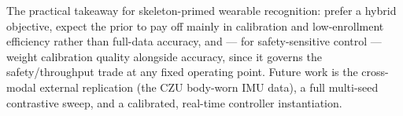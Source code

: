 The practical takeaway for skeleton-primed wearable recognition: prefer a hybrid objective, expect the prior to pay off mainly in calibration and low-enrollment efficiency rather than full-data accuracy, and --- for safety-sensitive control --- weight calibration quality alongside accuracy, since it governs the safety/throughput trade at any fixed operating point. Future work is the cross-modal external replication (the CZU body-worn IMU data), a full multi-seed contrastive sweep, and a calibrated, real-time controller instantiation.
